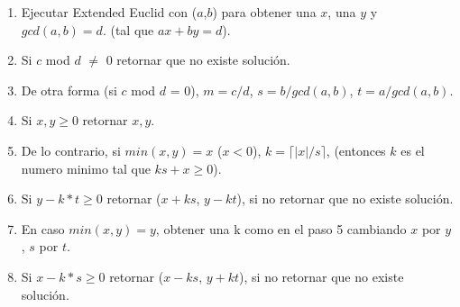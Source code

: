 \begin{enumerate}
    \item {Ejecutar Extended Euclid con ($a$,$b$) para obtener una $x$, una $y$ y $gcd(a,b) = d$. (tal que $ax + by = d$).}
    \item {Si $c$ mod $d$ $\neq$ $0$ retornar que no existe solución.}
    \item {De otra forma (si $c$ mod $d$ = $0$), $m = c/d$, $s = b/gcd(a,b)$, $t = a/gcd(a,b)$.}
    \item Si $x,y \geq 0$ retornar $x,y$.
    \item De lo contrario, si $min(x,y) = x$ ($x < 0$), $k = \lceil |x| / s \rceil$, (entonces $k$ es el numero minimo tal que $ks+x \geq 0 $).
    \item Si $y - k*t \geq 0$ retornar ($x+ks$, $y-kt$), si no retornar que no existe solución.
    \item En caso $min(x,y)=y$, obtener una k como en el paso 5 cambiando $x$ por $y$,  $s$ por $t$.
    \item Si $x - k*s \geq 0$ retornar ($x-ks$, $y+kt$), si no retornar que no existe solución.
\end{enumerate}

